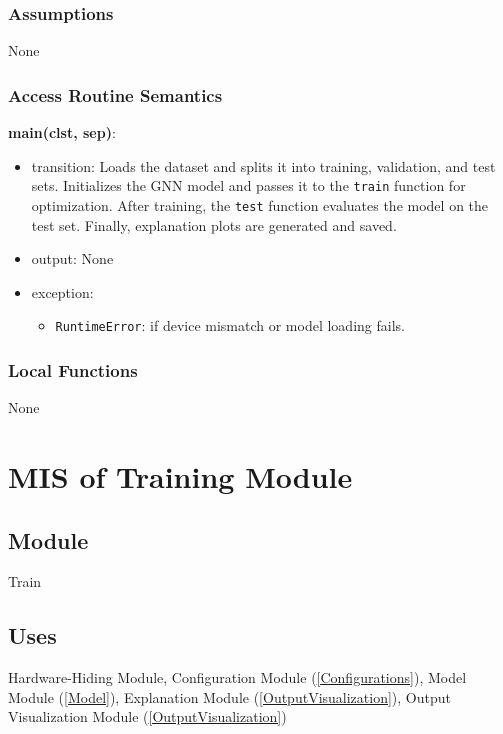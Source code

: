 \documentclass[12pt, titlepage]{article}
\begin{document}
\subsubsection{Assumptions}
None

\subsubsection{Access Routine Semantics}

\noindent \textbf{main(clst, sep)}:
\begin{itemize}
  \item transition: Loads the dataset and splits it into training, validation, and test sets. Initializes the GNN model and passes it to the \texttt{train} function for optimization. After training, the \texttt{test} function evaluates the model on the test set. Finally, explanation plots are generated and saved.
  \item output: None
  \item exception:
  \begin{itemize}
    \item \texttt{RuntimeError}: if device mismatch or model loading fails.
  \end{itemize}
\end{itemize}

\subsubsection{Local Functions}
None







\section{MIS of Training Module} \label{Train} 

\subsection{Module}
Train

\subsection{Uses}
Hardware-Hiding Module, Configuration Module (\ref{Configurations}), Model Module (\ref{Model}), Explanation Module (\ref{OutputVisualization}), Output Visualization Module (\ref{OutputVisualization})
\end{document}
